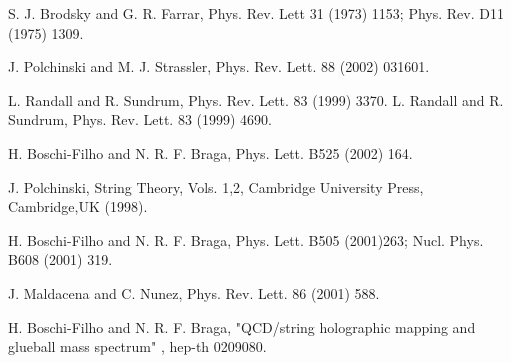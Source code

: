 \documentclass[a4paper,twocolumn,prd,groupedaddress,nofootinbib]{revtex4}
\begin{document}
\begin{thebibliography}{30}
 S. J. Brodsky and G. R. Farrar, Phys. Rev. Lett 31 (1973) 1153;
Phys. Rev. D11 (1975) 1309.

 J. Polchinski and M. J. Strassler, Phys. Rev. Lett. 88 (2002) 031601.

 L. Randall and R. Sundrum, Phys. Rev. Lett. 83 (1999) 
3370.
 L. Randall and R. Sundrum, Phys. Rev. Lett. 83 (1999)
4690.

 H. Boschi-Filho and N. R. F. Braga, Phys. Lett. B525 (2002) 164.

 J. Polchinski, String Theory, Vols. 1,2, Cambridge University Press,
Cambridge,UK  (1998).

 H. Boschi-Filho and N. R. F. Braga, Phys. Lett. B505 (2001)263;
 Nucl. Phys. B608 (2001) 319.

 J. Maldacena and C. Nunez, Phys. Rev. Lett. 86 (2001) 588.

 H. Boschi-Filho and N. R. F. Braga, "QCD/string holographic 
mapping and glueball mass spectrum" , hep-th 0209080. 
 \end{thebibliography}
\end{document}
